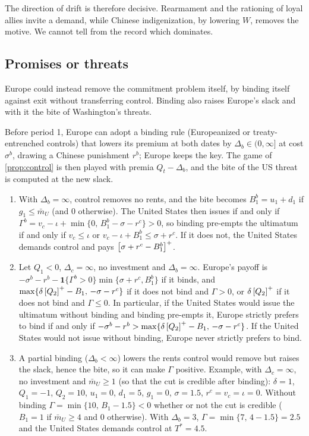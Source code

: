 The direction of drift is therefore decisive. Rearmament and the rationing of loyal allies invite a demand, while Chinese indigenization, by lowering $W$, removes the motive. We cannot tell from the record which dominates.

\subsection{Promises or threats}\label{sec:bind}

Europe could instead remove the commitment problem itself, by binding itself against exit without transferring control. Binding also raises Europe's slack and with it the bite of Washington's threats.

\begin{remark}\label{rem:bind}
Before period 1, Europe can adopt a binding rule (Europeanized or treaty-entrenched controls) that lowers its premium at both dates by $\Delta_b\in(0,\infty]$ at cost $\sigma^b$, drawing a Chinese punishment $r^b$; Europe keeps the key. The game of \cref{prop:control} is then played with premia $Q_t-\Delta_b$, and the bite of the US threat is computed at the new slack.
\begin{enumerate}[label=(\alph*)]
\item With $\Delta_b=\infty$, control removes no rents, and the bite becomes $B_1^b=u_1+d_1$ if $g_1\le\bar m_U$ (and $0$ otherwise). The United States then issues if and only if $\Gamma^b=v_c-\iota+\min\{0,\,B_1^b-\sigma-r^c\}>0$, so binding pre-empts the ultimatum if and only if $v_c\le\iota$ or $v_c-\iota+B_1^b\le\sigma+r^c$. If it does not, the United States demands control and pays $\left[\sigma+r^c-B_1^b\right]^{+}$.
\item Let $Q_1<0$, $\Delta_c=\infty$, no investment and $\Delta_b=\infty$. Europe's payoff is $-\sigma^b-r^b-\mathbf 1\{\Gamma^b>0\}\min\{\sigma+r^c,B_1^b\}$ if it binds, and $\max\{\delta\left[Q_2\right]^{+}-B_1,\,-\sigma-r^c\}$ if it does not bind and $\Gamma>0$, or $\delta\left[Q_2\right]^{+}$ if it does not bind and $\Gamma\le 0$. In particular, if the United States would issue the ultimatum without binding and binding pre-empts it, Europe strictly prefers to bind if and only if $-\sigma^b-r^b>\max\{\delta\left[Q_2\right]^{+}-B_1,\,-\sigma-r^c\}$. If the United States would not issue without binding, Europe never strictly prefers to bind.
\item A partial binding ($\Delta_b<\infty$) lowers the rents control would remove but raises the slack, hence the bite, so it can make $\Gamma$ positive. Example, with $\Delta_c=\infty$, no investment and $\bar m_U\ge 1$ (so that the cut is credible after binding): $\delta=1$, $Q_1=-1$, $Q_2=10$, $u_1=0$, $d_1=5$, $g_1=0$, $\sigma=1.5$, $r^c=v_c=\iota=0$. Without binding $\Gamma=\min\{10,\,B_1-1.5\}<0$ whether or not the cut is credible ($B_1=1$ if $\bar m_U\ge 4$ and $0$ otherwise). With $\Delta_b=3$, $\Gamma=\min\{7,\,4-1.5\}=2.5$ and the United States demands control at $T^*=4.5$.

\end{enumerate}
\end{remark}
